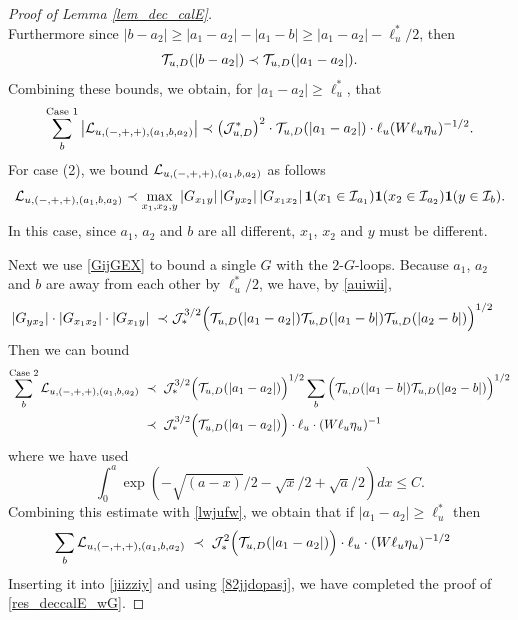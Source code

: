 \documentclass[10pt,reqno]{article}
\theoremstyle{plain} %
\theoremstyle{remark}
\numberwithin{equation}{section}
\begin{document}
\begin{proof}[Proof of Lemma \ref{lem_dec_calE}]
$$ $$
Furthermore since $|b-a_2|\ge |a_1-a_2|-|a_1-b|\ge |a_1-a_2|-\ell_u^*/2$, then
$${\cal T}_{u,D}(|b-a_2|) \prec  {\cal T}_{u,D}(|a_1-a_2|).
$$
Combining these bounds,  we obtain,   for $|a_1-a_2|\ge \ell_u^*$, that  
\begin{align}
    \label{lwjufw}
    \sum_{b } ^{\text{Case } 1} \left|{\cal L}_{u, (-,+,+),(a_1, b , a_2)}\right|\prec \left({\cal J}^*_{u,D}\right)^2\cdot{\cal T}_{u,D}(|a_1-a_2|) \cdot \ell_u(W\ell_u\eta_u)^{-1/2} .
\end{align}
For case (2),  we bound  ${\cal L}_{u, (-,+,+),(a_1, b , a_2)}$ as follows
\begin{align}\label{LGGGXXX}
{\cal L}_{u, (-,+,+),(a_1, b , a_2)}
\prec \max_{x_1,x_2, y} \left|G_{x_1y}\right| \left|G_{yx_2}\right|\left|G_{x_1x_2}\right|{\bf 1}(x_1\in {\cal I}_{a_1}){\bf 1}(x_2\in {\cal I}_{a_2}){\bf 1}(y\in {\cal I}_{b}).
\end{align}
 In this case, since $a_1$, $a_2$ and $b$ are all different,  $x_1$, $x_2$ and $y$ must be different.  
 
 
 Next we use   \eqref{GijGEX} to bound a single $G$ with the $2$-$G$-loops.   Because $a_1$, $a_2$ and $b$ are away from each other by $\ell_u^*/2$, we have, by  \eqref{auiwii}, 
 \begin{align}\label{GGTLJ}
 \left|G_{yx_2}\right|\cdot \left|G_{x_1x_2}\right| \cdot
\left|G_{x_1y}\right|
\;\prec \; & {\cal J}_*^{3/2} \Big( {\cal T}_{u,D}(|a_1-a_2|) {\cal T}_{u,D}(|a_1-b|){\cal T}_{u,D}(|a_2-b|)\Big)^{1/2}
 \end{align}
Then we can bound 
\begin{align}
    \sum_{b}^{ \text {Case } 2 }{\cal L}_{u, (-,+,+),(a_1, b , a_2)} 
 \;\prec \;  &\;{\cal J}_*^{3/2}\Big( {\cal T}_{u,D}(|a_1-a_2|)\Big)^{1/2} \sum_b \Big({\cal T}_{u,D}(|a_1-b|){\cal T}_{u,D}(|a_2-b|)\Big)^{1/2}
 \nonumber \\
  \;\prec \; &\;{\cal J}_*^{3/2}\Big( {\cal T}_{u,D}(|a_1-a_2|)\Big) \cdot  \ell_u\cdot  (W\ell_u\eta_u)^{-1}
\end{align}
where we have used
$$
\int_{0 }^a\exp\left(-\sqrt{(a-x)}/2-\sqrt x/2+ \sqrt a/2\right)dx\le C .
$$
Combining  this estimate with \eqref{lwjufw}, we obtain that if $|a_1-a_2|\ge \ell_u^*$ then
\begin{align}
    \sum_{b} {\cal L}_{u, (-,+,+),(a_1, b , a_2)} 
  \;\prec \; &\;{\cal J}_*^{2}\Big( {\cal T}_{u,D}(|a_1-a_2|)\Big) \cdot  \ell_u\cdot  (W\ell_u\eta_u)^{-1/2}
\end{align}
Inserting  it into \eqref{jiizziy} and using  \eqref{82jjdopasj}, we have completed the proof of  \eqref{res_deccalE_wG}.


\end{proof}
\end{document}
